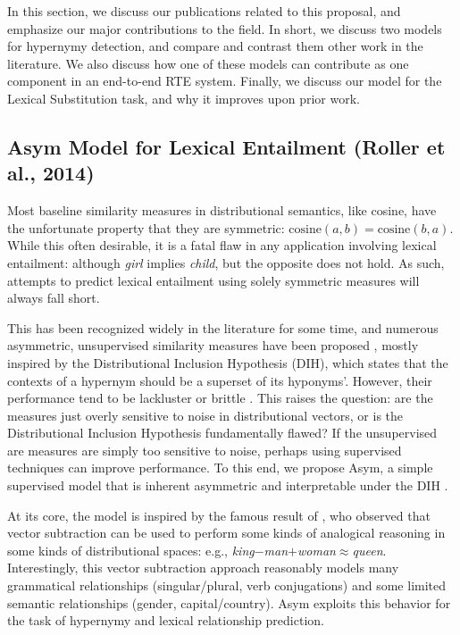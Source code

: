 \documentclass[12pt]{article}
\begin{document}
In this section, we discuss our publications related to this
proposal, and emphasize our major contributions to the field. In short, we
discuss two models for hypernymy detection, and compare and contrast them other
work in the literature. We also discuss how one of these models can contribute
as one component in an end-to-end RTE system. Finally, we discuss our model for
the Lexical Substitution task, and why it improves upon prior work.

\subsection{Asym Model for Lexical Entailment (Roller et al., 2014)}
\label{sec:asym}

Most baseline similarity measures in distributional semantics, like cosine,
have the unfortunate property that they are symmetric: $\text{cosine}(a, b) =
\text{cosine}(b, a)$. While this often desirable, it
is a fatal flaw in any application involving lexical entailment: although {\em
girl} implies {\em child}, but the opposite does not hold. As such, attempts to
predict lexical entailment using solely symmetric measures will always fall
short.

This has been recognized widely in the
literature for some time, and numerous asymmetric, unsupervised similarity measures have been
proposed
\cite{weeds:2003:emnlp,zhitomirsky-geffet:2005:acl,clarke:2009:gems,kotlerman:2010:nle,santus:2013:thesis},
mostly inspired by the Distributional Inclusion Hypothesis (DIH), which
states that the contexts of a hypernym should be a superset of its hyponyms'.
However, their
performance tend to be lackluster \cite{clarke:2009:gems} or brittle
\cite{kotlerman:2010:nle}. This raises the question: are the measures just
overly sensitive to noise in distributional vectors, or is the Distributional
Inclusion Hypothesis fundamentally flawed? If the unsupervised are measures
are simply too sensitive to noise, perhaps using supervised techniques can
improve performance.  To this end, we propose Asym, a simple supervised model
that is inherent asymmetric and interpretable under the DIH
\cite{roller:2014:coling}. 

At its core, the model is inspired by the famous result of
, who observed that vector subtraction can be used
to perform some kinds of analogical reasoning in some kinds of distributional
spaces: e.g., {\em king}$ - ${\em man}$ + ${\em woman}$ \approx ${\em queen}.
Interestingly, this vector subtraction approach reasonably models many
grammatical relationships (singular/plural, verb conjugations) and some limited
semantic relationships (gender, capital/country). Asym exploits this
behavior for the task of hypernymy and lexical relationship prediction.
\end{document}

